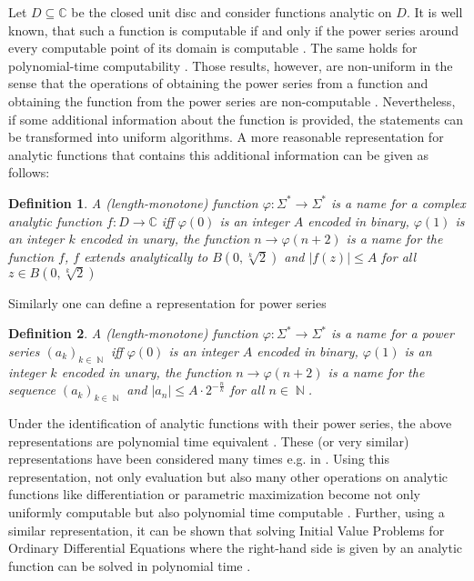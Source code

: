 \documentclass{article}
\newcommand{\CC}{\mathbb C}
\DeclareMathOperator{\NN}{\mathbb N}
\newcommand{\abs}[1]{\left|#1\right|}
\newtheorem{definition}{Definition}
\begin{document}
Let $D \subseteq \CC$ be the closed unit disc and consider functions analytic on $D$.
It is well known, that such a function is computable if and only if the power series around every computable point of its domain is computable \cite{MR1005942}.
The same holds for polynomial-time computability \cite{MR1137517}. 
Those results, however, are non-uniform in the sense that the operations of obtaining the power series from a function and obtaining the function from the power series are non-computable \cite{Mueller87}.
Nevertheless, if some additional information about the function is provided, the statements can be transformed into uniform algorithms.
A more reasonable representation for analytic functions that contains this additional information can be given as follows: 
\begin{definition}\label{def:function}
  A (length-monotone) function $\varphi: \Sigma^* \to \Sigma^*$ is a name for a complex analytic function $f:D \to \CC$ iff
  $\varphi(0)$ is an integer $A$ encoded in binary,
  $\varphi(1)$ is an integer $k$ encoded in unary,
  the function $n \to \varphi(n+2)$ is a name for the function $f$,
  $f$ extends analytically to $B(0, \sqrt[k]{2})$ and
  $\abs{f(z)} \leq A$ for all $z \in B(0, \sqrt[k]{2})$

\end{definition}
Similarly one can define a representation for power series 
\begin{definition}\label{def:powerseries}
  A (length-monotone) function $\varphi: \Sigma^* \to \Sigma^*$ is a name for a power series $(a_k)_{k \in \NN}$ iff
  $\varphi(0)$ is an integer $A$ encoded in binary,
  $\varphi(1)$ is an integer $k$ encoded in unary,
  the function $n \to \varphi(n+2)$ is a name for the sequence $(a_k)_{k \in \NN}$ and
  $\abs{a_n} \leq A \cdot 2^{-\frac{n}{k}}$ for all $n \in \NN$.
\end{definition}
Under the identification of analytic functions with their power series, the above representations are polynomial time equivalent \cite{Kawamura2012}.
These (or very similar) representations have been considered many times e.g. in \cite{Mueller95, Kawamura2012,DBLP:journals/corr/PaulyS15,DBLP:journals/jsc/Hoeven05}.
Using this representation, not only evaluation but also many other operations on analytic functions like differentiation or parametric maximization become not only uniformly computable but also polynomial time computable \cite{Kawamura2012}.
Further, using a similar representation, it can be shown that solving Initial Value Problems for Ordinary Differential Equations where the right-hand side is given by an analytic function can be solved in polynomial time \cite{moiske1993solving}.
\end{document}
